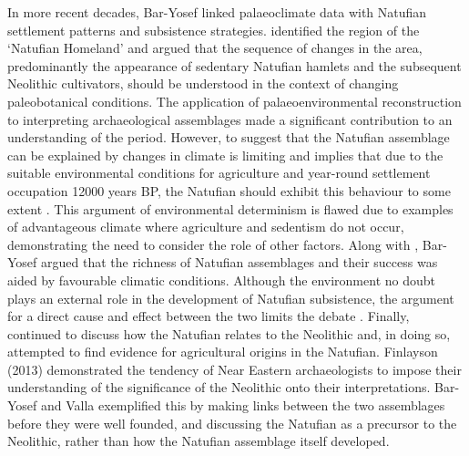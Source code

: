 \documentclass[%
	]{ijsra}
\begin{document}
In more recent decades, Bar-Yosef linked palaeoclimate data with Natufian settlement patterns and subsistence strategies. \textcite[157]{Bar-Yosef_1998} identified the region of the ‘Natufian Homeland’ and argued that the sequence of changes in the area, predominantly the appearance of sedentary Natufian hamlets and the subsequent Neolithic cultivators, should be understood in the context of changing paleobotanical conditions. The application of palaeoenvironmental reconstruction to interpreting archaeological assemblages made a significant contribution to an understanding of the period. 
However, to suggest that the Natufian assemblage can be explained by changes in climate is limiting and implies that due to the suitable environmental conditions for agriculture and year-round settlement occupation \num{12000} years BP, the Natufian should exhibit this behaviour to some extent \parencite[161]{Bar-Yosef_1998}. This argument of environmental determinism is flawed due to examples of advantageous climate where agriculture and sedentism do not occur, demonstrating the need to consider the role of other factors. 
Along with \textcite{Valla_1999}, Bar-Yosef argued that the richness of Natufian assemblages and their success was aided by favourable climatic conditions. 
Although the environment no doubt plays an external role in the development of Natufian subsistence, the argument for a direct cause and effect between the two limits the debate \parencite{Fletcher_2007}. 
Finally, \textcite[175]{Bar-Yosef_2011} continued to discuss how the Natufian relates to the Neolithic and, in doing so, attempted to find evidence for agricultural origins in the Natufian. 
Finlayson (2013) %
demonstrated the tendency of Near Eastern archaeologists to impose their understanding of the significance of the Neolithic onto their interpretations. Bar-Yosef and Valla exemplified this by making links between the two assemblages before they were well founded, and discussing the Natufian as a precursor to the Neolithic, rather than how the Natufian assemblage itself developed. 
\end{document}
